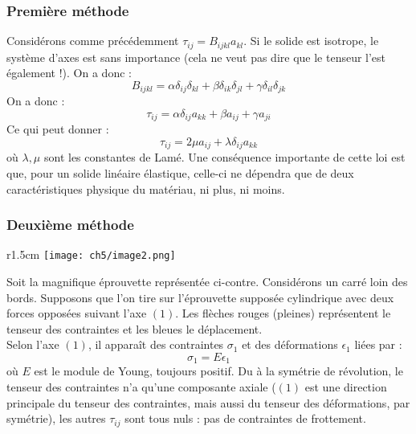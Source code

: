     \subsubsection{Première méthode}
    Considérons comme précédemment $\tau_{ij} = B_{ijkl}a_{kl}$. Si le solide est isotrope,
    le système d'axes est sans importance (cela ne veut pas dire que le tenseur l'est 
    également !). On a donc : 
    \begin{equation}
    B_{ijkl} = \alpha \delta_{ij}\delta_{kl} + \beta\delta_{ik}\delta_{jl} +\gamma\delta_{il}
    \delta_{jk} 
    \end{equation}
    On a donc :
    \begin{equation}
    \tau_{ij} = \alpha\delta_{ij}a_{kk} + \beta a_{ij} + \gamma a_{ji} 
    \end{equation}
    Ce qui peut donner :
    \begin{equation}
    \tau_{ij} = 2\mu a_{ij} + \lambda \delta_{ij}a_{kk}
    \end{equation}
    où $\lambda,\mu$ sont les constantes de Lamé. Une conséquence importante de cette loi est
    que, pour un solide linéaire élastique, celle-ci ne dépendra que de deux caractéristiques
    physique du matériau, ni plus, ni moins.
    
    
    \subsubsection{Deuxième méthode}
    \begin{wrapfigure}[15]{r}{1.5cm}
    \texttt{[image: ch5/image2.png]}
    \end{wrapfigure}
    Soit la magnifique éprouvette représentée ci-contre. Considérons un carré loin des bords.
    Supposons que l'on tire sur l'éprouvette supposée cylindrique avec deux forces opposées 
    suivant l'axe $(1)$. Les flèches rouges (pleines) représentent le tenseur des contraintes
    et les bleues le déplacement.\\
    Selon l'axe $(1)$, il apparaît des contraintes $\sigma_1$ et des déformations $\epsilon_1$ 
    liées par :
    \begin{equation}
    \sigma_1 = E\epsilon_1
    \end{equation}
    où $E$ est le module de Young, toujours positif. Du à la symétrie de révolution, le tenseur
    des contraintes n'a qu'une composante axiale ($(1)$ est une direction principale du tenseur
    des contraintes, mais aussi du tenseur des déformations, par symétrie), les autres $
    \tau_{ij}$ sont tous nuls : pas de contraintes de frottement.\\
    
